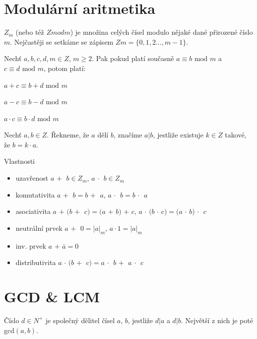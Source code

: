 \documentclass{szzclass}
\author{Daniel Hampl}
\begin{document}

\tableofcontents
\newpage

\section{Modulární aritmetika}
$Z_m$ (nebo též $Z mod m$) je množina celých čísel modulo nějaké dané přirozené číslo $m$. Nejčastěji se
setkáme se zápisem $Zm = \{0, 1, 2 . . . , m - 1\}$.

Nechť $a, b, c, d, m \in Z$, $m \geq 2$. Pak pokud platí současně $a \equiv b \text{ mod } m$ a $c \equiv d \text{ mod } m$, potom platí:

\begin{center}
$a + c \equiv b + d \text{ mod } m$

$a - c \equiv b - d \text{ mod } m$

$a \cdot c \equiv b \cdot d \text{ mod } m$
\end{center}

Nechť $a, b \in Z$. Řekneme, že $a$ dělí $b$, značíme $a|b$, jestliže
existuje $k \in Z$ takové, že $b = k \cdot a$.

Vlastnosti
\begin{itemize}
    \item uzavřenost $a$ \textcircled{$+$} $b \in Z_m$, $a$ \textcircled{$\cdot$} $b \in Z_m$
    \item komutativita $a$ \textcircled{$+$} $b = b$ \textcircled{$+$} $a$, $a$ \textcircled{$\cdot$} $b = b$ \textcircled{$\cdot$} $a$
    \item asociativita $a$ \textcircled{$+$} $(b$ \textcircled{$+$} $c) = (a$ \textcircled{$+$} $b)$ \textcircled{$+$} $c$,
    $a$ \textcircled{$\cdot$} $(b$ \textcircled{$\cdot$} $c) = (a$ \textcircled{$\cdot$} $b)$ \textcircled{$\cdot$} $c$
    \item neutrální prvek $a$ \textcircled{$+$} $0 = |a|_m$, $a \cdot 1 = |a|_m$
    \item inv. prvek $a$ \textcircled{$+$} $\bar{a} = 0$
    \item distributivita $a$ \textcircled{$\cdot$} $(b$ \textcircled{$+$} $c) = a$ \textcircled{$\cdot$} $b$ \textcircled{$+$} $a$ \textcircled{$\cdot$} $c$
\end{itemize}

\newpage

\section{GCD \& LCM}
Číslo $d \in N^+$ je společný dělitel čísel $a$, $b$, jestliže $d|a$ a $d|b$. Největší z nich je poté gcd$(a,b)$.
\end{document}
